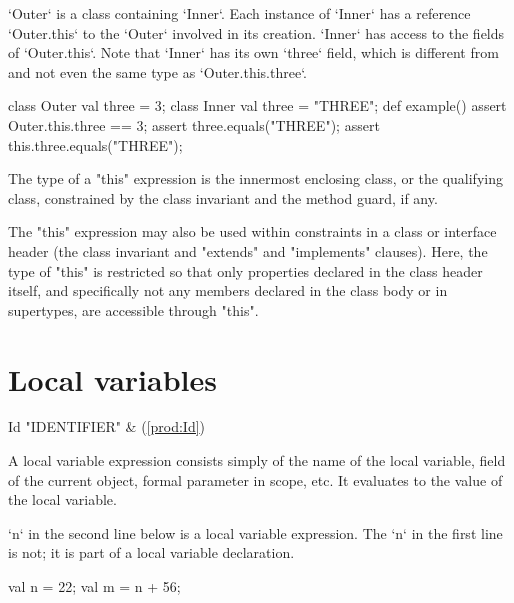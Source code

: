 \begin{ex}
\xcd`Outer` is a class containing \xcd`Inner`.  Each instance of
\xcd`Inner` has a reference \xcd`Outer.this` to the \xcd`Outer` involved in its
creation.  \xcd`Inner` has access to the fields of \xcd`Outer.this`.  Note
that \xcd`Inner` has its own \xcd`three` field, which is different from and not even the same
type as \xcd`Outer.this.three`. 
\begin{xten}
class Outer {
  val three = 3;
  class Inner {
     val three = "THREE";
     def example()  {
       assert Outer.this.three == 3;
       assert three.equals("THREE");
       assert this.three.equals("THREE");
     }
  }
}
\end{xten}
\end{ex}

The type of a \xcd"this" expression is the
innermost enclosing class, or the qualifying class,
constrained by the class invariant and the
method guard, if any.

The \xcd"this" expression may also be used within constraints in
a class or interface header (the class invariant and
\xcd"extends" and \xcd"implements" clauses).  Here, the type of
\xcd"this" is restricted so that only properties declared in the
class header itself, and specifically not any members declared in the class
body or in supertypes, are accessible through \xcd"this".

\section{Local variables}

\begin{bbgrammar}
                  Id \: \xcd"IDENTIFIER"  & (\ref{prod:Id}) \\
\end{bbgrammar}

A local variable expression consists simply of the name of the local variable,
field of the current object, formal parameter in scope, etc. It evaluates to
the value of the local variable. 


\begin{ex}
\xcd`n` in the second line below is a local
variable expression.  The \xcd`n` in the first line is not; it is part of a
local variable declaration.
\begin{xten}
val n = 22;
val m = n + 56;
\end{xten}

\end{ex}

